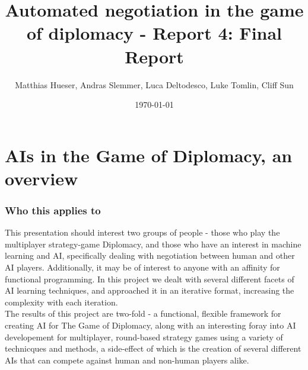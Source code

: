 \documentclass[11pt]{article}
\title{Automated negotiation in the game of diplomacy - Report 4: Final Report}
\author{Matthias Hueser, Andras Slemmer, Luca Deltodesco, Luke Tomlin, Cliff Sun}
\date{\today}
\begin{document}
\maketitle

\section{AIs in the Game of Diplomacy, an overview}
\subsubsection{Who this applies to}
This presentation should interest two groups of people - those who play the multiplayer strategy-game Diplomacy, and those who have an interest in machine learning and AI, specifically dealing with negotiation between human and other AI players. Additionally, it may be of interest to anyone with an affinity for functional programming. In this project we dealt with several different facets of AI learning techniques, and approached it in an iterative format, increasing the complexity with each iteration.
\\
The results of this project are two-fold - a functional, flexible framework for creating AI for The Game of Diplomacy, along with an interesting foray into AI developement for multiplayer, round-based strategy games using a variety of technicques and methods, a side-effect of which is the creation of several different AIs that can compete against human and non-human players alike.
\end{document}
